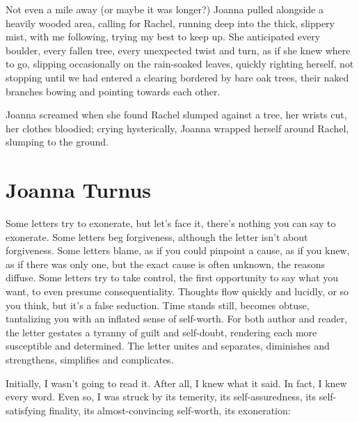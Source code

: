 Not even a mile away (or maybe it was longer?) Joanna pulled alongside a
heavily wooded area, calling for Rachel, running deep into the thick,
slippery mist, with me following, trying my best to keep up. She
anticipated every boulder, every fallen tree, every unexpected twist and
turn, as if she knew where to go, slipping occasionally on the
rain-soaked leaves, quickly righting herself, not stopping until we had
entered a clearing bordered by bare oak trees, their naked branches
bowing and pointing towards each other.

Joanna screamed when she found Rachel slumped against a tree, her wrists
cut, her clothes bloodied; crying hysterically, Joanna \linebreak wrapped herself
around Rachel, slumping to the ground.

\chapter{Joanna Turnus}

\titlemark

Some letters try to exonerate, but let's face it, there's nothing you
can say to exonerate. Some letters beg forgiveness, although the letter
isn't about forgiveness. Some letters blame, as if you could pinpoint a
cause, as if you knew, as if there was only one, but the exact cause is
often unknown, the reasons diffuse. Some letters try to take control,
the first opportunity to say what you want, to even presume
consequentiality. Thoughts flow quickly and lucidly, or so you think,
but it's a false seduction. Time stands still, becomes obtuse,
tantalizing you with an inflated sense of self-worth. For both author
and reader, the letter gestates a tyranny of guilt and self-doubt,
rendering each more susceptible and determined. The letter unites and
separates, diminishes and strengthens, simplifies and complicates.

Initially, I wasn't going to read it. After all, I knew what it said. In
fact, I knew every word. Even so, I was struck by its temerity, its
self-assuredness, its self-satisfying finality, its almost-convincing
self-worth, its exoneration:

